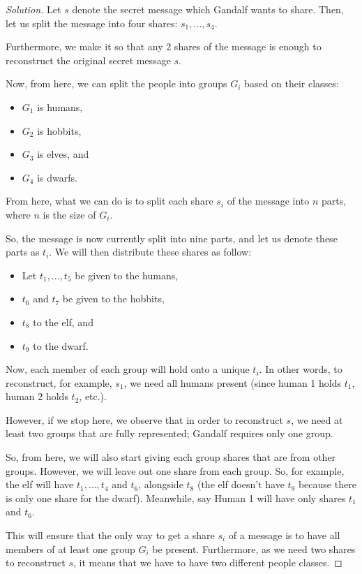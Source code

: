 \documentclass{article}
\newenvironment{solution}{\begin{proof}[Solution]}{\end{proof}}
\begin{document}
\begin{solution}
	Let $s$ denote the secret message which Gandalf wants to share. Then, let us split the message into four shares: $s_{1}, \ldots, s_{4}$.
	
	Furthermore, we make it so that any $2$ shares of the message is enough to reconstruct the original secret message $s$.
	
	Now, from here, we can split the people into groups $G_{i}$ based on their classes:
	\begin{itemize}
		\item $G_{1}$ is humans,
		\item $G_{2}$ is hobbits,
		\item $G_{3}$ is elves, and
		\item $G_{4}$ is dwarfs.
	\end{itemize}    
	
	From here, what we can do is to split each share $s_{i}$ of the message into $n$ parts, where $n$ is the size of $G_{i}$.
	
	So, the message is now currently split into nine parts, and let us denote these parts as $t_{i}$. We will then distribute these shares as follow:
	\begin{itemize}
		\item Let $t_{1}, \ldots, t_{5}$ be given to the humans,
		\item $t_{6}$ and $t_{7}$ be given to the hobbits,
		\item $t_{8}$ to the elf, and
		\item $t_{9}$ to the dwarf.
	\end{itemize}
	
	Now, each member of each group will hold onto a unique $t_{i}$. In other words, to reconstruct, for example, $s_{1}$, we need all humans present (since human 1 holds $t_{1}$, human 2 holds $t_{2}$, etc.).
	
	However, if we stop here, we observe that in order to reconstruct $s$, we need at least two groups that are fully represented; Gandalf requires only one group.
	
	So, from here, we will also start giving each group shares that are from other groups. However, we will leave out one share from each group. So, for example, the elf will have $t_{1}, \ldots, t_{4}$ and $t_{6}$, alongside $t_{8}$ (the elf doesn't have $t_{9}$ because there is only one share for the dwarf). Meanwhile, say Human 1 will have only shares $t_{1}$ and $t_{6}$.
	
	This will ensure that the only way to get a share $s_{i}$ of a message is to have all members of at least one group $G_{i}$ be present. Furthermore, as we need two shares to reconstruct $s$, it means that we have to have two different people classes.
\end{solution}
\end{document}
